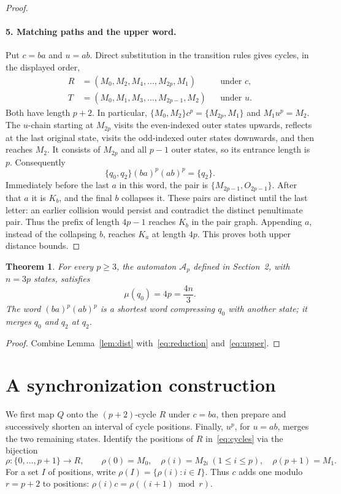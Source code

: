 \documentclass[11pt]{article}
\newtheorem{theorem}{Theorem}
\newcommand{\M}[1]{M_{#1}}
\newcommand{\Ost}[1]{O_{#1}}
\newcommand{\pair}[2]{\{#1,#2\}}
\begin{document}
\begin{proof}
\paragraph{5. Matching paths and the upper word.}
Put $c=ba$ and $u=ab$. Direct substitution in the transition rules gives cycles, in the displayed order,
\begin{equation}\label{eq:cycles}
 \begin{aligned}
 R&=(\M0,\M2,\M4,\ldots,\M{2p},\M1) &&\text{under }c,\\
 T&=(\M0,\M1,\M3,\ldots,\M{2p-1},\M2) &&\text{under }u.
 \end{aligned}
\end{equation}
Both have length $p+2$. In particular, $\pair{\M0}{\M2}c^p=\pair{\M{2p}}{\M1}$ and $\M1u^p=\M2$. The $u$-chain starting at $\M{2p}$ visits the even-indexed outer states upwards, reflects at the last original state, visits the odd-indexed outer states downwards, and then reaches $\M2$. It consists of $\M{2p}$ and all $p-1$ outer states, so its entrance length is $p$. Consequently
\begin{equation}\label{eq:upper}
 \pair{q_0}{q_2}(ba)^p(ab)^p=\{q_2\}.
\end{equation}
Immediately before the last $a$ in this word, the pair is $\pair{\M{2p-1}}{\Ost{2p-1}}$. After that $a$ it is $K_b$, and the final $b$ collapses it. These pairs are distinct until the last letter: an earlier collision would persist and contradict the distinct penultimate pair. Thus the prefix of length $4p-1$ reaches $K_b$ in the pair graph. Appending $a$, instead of the collapsing $b$, reaches $K_a$ at length $4p$. This proves both upper distance bounds.
\end{proof}

\begin{theorem}\label{thm:main}
For every $p\geq3$, the automaton $\mathcal A_p$ defined in Section~2, with $n=3p$ states, satisfies
\[
 \mu(q_0)=4p=\frac{4n}{3}.
\]
The word $(ba)^p(ab)^p$ is a shortest word compressing $q_0$ with another state; it merges $q_0$ and $q_2$ at $q_2$.
\end{theorem}
\begin{proof}
Combine Lemma~\ref{lem:dist} with~\eqref{eq:reduction} and~\eqref{eq:upper}.
\end{proof}
\section{A synchronization construction}
We first map $Q$ onto the $(p+2)$-cycle $R$ under $c=ba$, then prepare and successively shorten an interval of cycle positions. Finally, $u^p$, for $u=ab$, merges the two remaining states. Identify the positions of $R$ in~\eqref{eq:cycles} via the bijection
\[
 \rho:\{0,\ldots,p+1\}\longrightarrow R,\qquad
 \rho(0)=\M0,\quad \rho(i)=\M{2i}\ (1\leq i\leq p),\quad
 \rho(p+1)=\M1.
\]
For a set $I$ of positions, write $\rho(I)=\{\rho(i):i\in I\}$. Thus $c$ adds one modulo $r=p+2$ to positions: $\rho(i)c=\rho((i+1)\bmod r)$.
\end{document}
